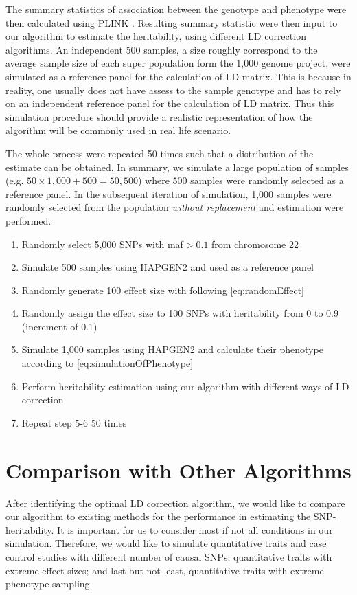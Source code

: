 \documentclass[12pt]{scrbook}
\begin{document}
The summary statistics of association between the genotype and phenotype were then calculated using PLINK \citep{Purcell2007}.
Resulting summary statistic were then input to our algorithm to estimate the heritability, using different \gls{LD} correction algorithms.
An independent 500 samples, a size roughly correspond to the average sample size of each super population form the 1,000 genome project,  were simulated as a reference panel for the calculation of \gls{LD} matrix.
This is because in reality, one usually does not have assess to the sample genotype and has to rely on an independent reference panel for the calculation of \gls{LD} matrix. 
Thus this simulation procedure should provide a realistic representation of how the algorithm will be commonly used in real life scenario.

The whole process were repeated 50 times such that a distribution of the estimate can be obtained. 
In summary, we simulate a large population of samples (e.g. $50\times1,000+500 = 50,500$) where 500 samples were randomly selected as a reference panel. 
In the subsequent iteration of simulation, 1,000 samples were randomly selected from the population \textit{without replacement} and estimation were performed.
\begin{enumerate}
	\item Randomly select 5,000 \glspl{SNP} with \gls{maf}$>0.1$ from chromosome 22
	\item Simulate 500 samples using HAPGEN2 and used as a reference panel
	\item Randomly generate 100 effect size with following \cref{eq:randomEffect}
	\item Randomly assign the effect size to 100 \glspl{SNP} with heritability from 0 to 0.9 (increment of 0.1)
	\item Simulate 1,000 samples using HAPGEN2 and calculate their phenotype according to \cref{eq:simulationOfPhenotype} 
	\item Perform heritability estimation using our algorithm with different ways of \gls{LD} correction
	\item Repeat step 5-6 50 times
\end{enumerate}

\section{Comparison with Other Algorithms}
After identifying the optimal \gls{LD} correction algorithm, we would like to compare our algorithm to existing methods for the performance in estimating the \gls{SNP}-heritability.
It is important for us to consider most if not all conditions in our simulation. 
Therefore, we would like to simulate quantitative traits and case control studies with different number of causal \glspl{SNP}; quantitative traits with extreme effect sizes; and last but not least, quantitative traits with extreme phenotype sampling.
\end{document}
